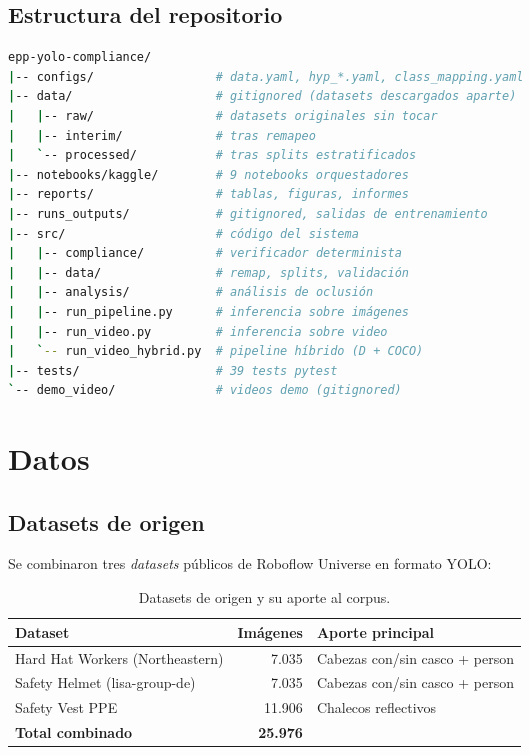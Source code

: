\documentclass[journal,onecolumn,11pt]{IEEEtran}
\begin{document}
\subsection{Estructura del repositorio}

\begin{lstlisting}[language=bash, basicstyle=\ttfamily\scriptsize, caption={Estructura del repositorio Git.}]
epp-yolo-compliance/
|-- configs/                 # data.yaml, hyp_*.yaml, class_mapping.yaml
|-- data/                    # gitignored (datasets descargados aparte)
|   |-- raw/                 # datasets originales sin tocar
|   |-- interim/             # tras remapeo
|   `-- processed/           # tras splits estratificados
|-- notebooks/kaggle/        # 9 notebooks orquestadores
|-- reports/                 # tablas, figuras, informes
|-- runs_outputs/            # gitignored, salidas de entrenamiento
|-- src/                     # código del sistema
|   |-- compliance/          # verificador determinista
|   |-- data/                # remap, splits, validación
|   |-- analysis/            # análisis de oclusión
|   |-- run_pipeline.py      # inferencia sobre imágenes
|   |-- run_video.py         # inferencia sobre video
|   `-- run_video_hybrid.py  # pipeline híbrido (D + COCO)
|-- tests/                   # 39 tests pytest
`-- demo_video/              # videos demo (gitignored)
\end{lstlisting}

\section{Datos}

\subsection{Datasets de origen}

Se combinaron tres \textit{datasets} públicos de Roboflow Universe
\cite{roboflow} en formato YOLO:

\begin{table}[H]
\centering
\caption{Datasets de origen y su aporte al corpus.}
\label{tab:datasets}
\begin{tabular}{l r p{5.5cm}}
\toprule
\textbf{Dataset} & \textbf{Imágenes} & \textbf{Aporte principal} \\
\midrule
Hard Hat Workers (Northeastern) & 7.035 & Cabezas con/sin casco + person \\
Safety Helmet (lisa-group-de) & 7.035 & Cabezas con/sin casco + person \\
Safety Vest PPE & 11.906 & Chalecos reflectivos \\
\midrule
\textbf{Total combinado} & \textbf{25.976} & \\
\bottomrule
\end{tabular}
\end{table}
\end{document}
